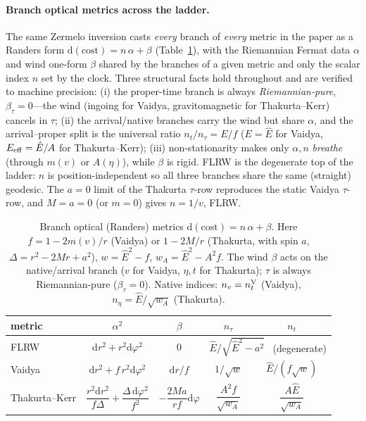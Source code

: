 \documentclass[12pt]{iopart}
\newcommand{\Ehat}{\hat E}
\newcommand{\dd}{\mathrm{d}}
\begin{document}
\paragraph{Branch optical metrics across the ladder.} The same Zermelo inversion
casts \emph{every} branch of \emph{every} metric in the paper as a Randers form
$\dd(\text{cost})=n\,\alpha+\beta$ (Table~\ref{tab:optical}), with the Riemannian
Fermat data $\alpha$ and wind one-form $\beta$ shared by the branches of a given
metric and only the scalar index $n$ set by the clock. Three structural facts
hold throughout and are verified to machine precision: (i) the proper-time branch
is always \emph{Riemannian-pure}, $\beta_\tau=0$---the wind (ingoing for Vaidya,
gravitomagnetic for Thakurta--Kerr) cancels in $\tau$; (ii) the arrival/native
branches carry the wind but share $\alpha$, and the arrival--proper split is the
universal ratio $n_t/n_\tau=E/f$ ($E=\Ehat$ for Vaidya, $E_{\rm eff}=\Ehat/A$ for
Thakurta--Kerr); (iii) non-stationarity makes only $\alpha,n$ \emph{breathe}
(through $m(v)$ or $A(\eta)$), while $\beta$ is rigid. FLRW is the degenerate top
of the ladder: $n$ is position-independent so all three branches share the same
(straight) geodesic. The $a=0$ limit of the Thakurta $\tau$-row reproduces the
static Vaidya $\tau$-row, and $M=a=0$ (or $m=0$) gives $n=1/v$, FLRW.

\begin{table}[ht]
    \centering
    \small
    \caption{Branch optical (Randers) metrics $\dd(\text{cost})=n\,\alpha+\beta$.
    Here $f=1-2m(v)/r$ (Vaidya) or $1-2M/r$ (Thakurta, with spin $a$,
    $\Delta=r^2-2Mr+a^2$), $w=\Ehat^2-f$, $w_A=\Ehat^2-A^2f$. The wind $\beta$
    acts on the native/arrival branch ($v$ for Vaidya, $\eta,t$ for Thakurta);
    $\tau$ is always Riemannian-pure ($\beta_\tau=0$). Native indices:
    $n_v=n_t^{\rm V}$ (Vaidya), $n_\eta=\Ehat/\sqrt{w_A}$ (Thakurta).}
    \label{tab:optical}
    \begin{tabular}{lcccc}
    \hline
    metric & $\alpha^2$ & $\beta$ & $n_\tau$ & $n_t$ \\
    \hline
    FLRW & $\dd r^2+r^2\dd\varphi^2$ & $0$
      & \multicolumn{2}{c}{$\Ehat/\sqrt{\Ehat^2-a^2}$ \ (degenerate)} \\[2pt]
    Vaidya & $\dd r^2+f\,r^2\dd\varphi^2$ & $\dd r/f$
      & $1/\sqrt{w}$ & $\Ehat/(f\sqrt{w})$ \\[2pt]
    Thakurta--Kerr
      & $\dfrac{r^2\dd r^2}{f\Delta}+\dfrac{\Delta\,\dd\varphi^2}{f^2}$
      & $-\dfrac{2Ma}{rf}\dd\varphi$
      & $\dfrac{A^2 f}{\sqrt{w_A}}$ & $\dfrac{A\Ehat}{\sqrt{w_A}}$ \\[3pt]
    \hline
    \end{tabular}
\end{table}
\end{document}
